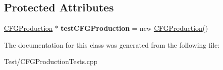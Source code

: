 \subsection*{Protected Attributes}
\begin{DoxyCompactItemize}
\item 
\mbox{\label{classCFGProductionTests_a58a043e77c5f16a08fc0e5d365141c8c}} 
\hyperlink{classCFGProduction}{C\+F\+G\+Production} $\ast$ {\bfseries test\+C\+F\+G\+Production} = new \hyperlink{classCFGProduction}{C\+F\+G\+Production}()
\end{DoxyCompactItemize}


The documentation for this class was generated from the following file\+:\begin{DoxyCompactItemize}
\item 
Test/C\+F\+G\+Production\+Tests.\+cpp\end{DoxyCompactItemize}
